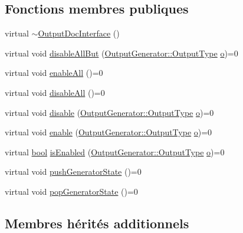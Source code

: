 \subsection*{Fonctions membres publiques}
\begin{DoxyCompactItemize}
\item 
virtual \hyperlink{class_output_doc_interface_a1a2f1e861208c6ded212292921096109}{$\sim$\+Output\+Doc\+Interface} ()
\item 
virtual void \hyperlink{class_output_doc_interface_a304402b5e336d9706678f3d11e5efeae}{disable\+All\+But} (\hyperlink{class_output_generator_ab79b5d3c19d95c8a5929c07f5b2918cf}{Output\+Generator\+::\+Output\+Type} \hyperlink{060__command__switch_8tcl_a495e7a4ede0831107e9d435080a7c268}{o})=0
\item 
virtual void \hyperlink{class_output_doc_interface_a418b5b7b81a6d37eff05a7cfe8143573}{enable\+All} ()=0
\item 
virtual void \hyperlink{class_output_doc_interface_a8adfa92c26950748e6d853dde09a98f5}{disable\+All} ()=0
\item 
virtual void \hyperlink{class_output_doc_interface_a9fbc5bc49aefab5a46f18864f396f011}{disable} (\hyperlink{class_output_generator_ab79b5d3c19d95c8a5929c07f5b2918cf}{Output\+Generator\+::\+Output\+Type} \hyperlink{060__command__switch_8tcl_a495e7a4ede0831107e9d435080a7c268}{o})=0
\item 
virtual void \hyperlink{class_output_doc_interface_ac6eb8fe41ef1c29d92348db248989263}{enable} (\hyperlink{class_output_generator_ab79b5d3c19d95c8a5929c07f5b2918cf}{Output\+Generator\+::\+Output\+Type} \hyperlink{060__command__switch_8tcl_a495e7a4ede0831107e9d435080a7c268}{o})=0
\item 
virtual \hyperlink{qglobal_8h_a1062901a7428fdd9c7f180f5e01ea056}{bool} \hyperlink{class_output_doc_interface_a6b48e942d7e057f79ed44f96353dab24}{is\+Enabled} (\hyperlink{class_output_generator_ab79b5d3c19d95c8a5929c07f5b2918cf}{Output\+Generator\+::\+Output\+Type} \hyperlink{060__command__switch_8tcl_a495e7a4ede0831107e9d435080a7c268}{o})=0
\item 
virtual void \hyperlink{class_output_doc_interface_aba5fd4dd5b0360723e62fedc7d353f29}{push\+Generator\+State} ()=0
\item 
virtual void \hyperlink{class_output_doc_interface_a4fb05016264d9c9f0946c2fd8e7b8e56}{pop\+Generator\+State} ()=0
\end{DoxyCompactItemize}
\subsection*{Membres hérités additionnels}


